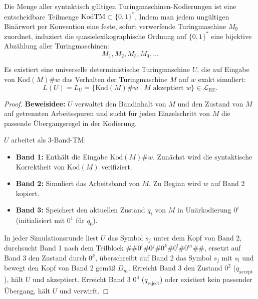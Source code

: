 \begin{lemma}
    Die Menge aller syntaktisch gültigen Turingmaschinen-Kodierungen ist eine entscheidbare Teilmenge $\mathrm{KodTM} \subset \{0, 1\}^*$. Indem man jedem ungültigen Binärwort per Konvention eine feste, sofort verwerfende Turingmaschine $M_\emptyset$ zuordnet, induziert die quasielexikographische Ordnung auf $\{0, 1\}^*$ eine bijektive Abzählung aller Turingmaschinen:
    \[
        M_1, M_2, M_3, M_4, \dots
    \]
\end{lemma}

\begin{theorem}
    Es existiert eine universelle deterministische Turingmaschine $U$, die auf Eingabe von $\mathrm{Kod}(M) \# w$ das Verhalten der Turingmaschine $M$ auf $w$ exakt simuliert:
    \[
        L(U) = L_U = \{\mathrm{Kod}(M) \# w \mid M \text{ akzeptiert } w\} \in \mathcal{L}_{\mathrm{RE}}.
    \]
\end{theorem}

\begin{proof}
    \textbf{Beweisidee:} $U$ verwaltet den Bandinhalt von $M$ und den Zustand von $M$ auf getrennten Arbeitsspuren und sucht für jeden Einzelschritt von $M$ die passende Übergangsregel in der Kodierung.
    
    $U$ arbeitet als 3-Band-TM:
    \begin{itemize}
        \item \textbf{Band 1:} Enthält die Eingabe $\mathrm{Kod}(M) \# w$. Zunächst wird die syntaktische Korrektheit von $\mathrm{Kod}(M)$ verifiziert.
        \item \textbf{Band 2:} Simuliert das Arbeitsband von $M$. Zu Beginn wird $w$ auf Band 2 kopiert.
        \item \textbf{Band 3:} Speichert den aktuellen Zustand $q_i$ von $M$ in Unärkodierung $0^i$ (initialisiert mit $0^1$ für $q_0$).
    \end{itemize}
    In jeder Simulationsrunde liest $U$ das Symbol $s_j$ unter dem Kopf von Band 2, durchsucht Band 1 nach dem Teilblock $\#\# 0^i \# 0^j \# 0^k \# 0^l \# 0^m \#\#$, ersetzt auf Band 3 den Zustand durch $0^k$, überschreibt auf Band 2 das Symbol $s_j$ mit $s_l$ und bewegt den Kopf von Band 2 gemäß $D_m$.
    Erreicht Band 3 den Zustand $0^2$ ($q_{\mathrm{accept}}$), hält $U$ und akzeptiert. Erreicht Band 3 $0^3$ ($q_{\mathrm{reject}}$) oder existiert kein passender Übergang, hält $U$ und verwirft.
\end{proof}

